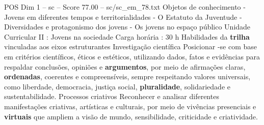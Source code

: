 \begin{textsample}{POS Dim 1 – sc – Score 77.00 – sc/sc\_em\_78.txt}
Objetos de conhecimento - Jovens em diferentes tempos e territorialidades - O Estatuto da Juventude - Diversidades e protagonismo dos jovens - Os jovens no espaço público Unidade Curricular II : Jovens na sociedade Carga horária : 30 h Habilidades da \textbf{trilha} vinculadas aos eixos estruturantes Investigação científica Posicionar -se com base em critérios científicos, éticos e estéticos, utilizando dados, fatos e evidências para respaldar conclusões, opiniões e \textbf{argumentos}, por meio de afirmações claras, \textbf{ordenadas}, coerentes e compreensíveis, sempre respeitando valores universais, como liberdade, democracia, justiça social, \textbf{pluralidade}, solidariedade e sustentabilidade.
Processos criativos Reconhecer e analisar diferentes manifestações criativas, artísticas e culturais, por meio de vivências presenciais e \textbf{virtuais} que ampliem a visão de mundo, sensibilidade, criticidade e criatividade.

\end{textsample}
